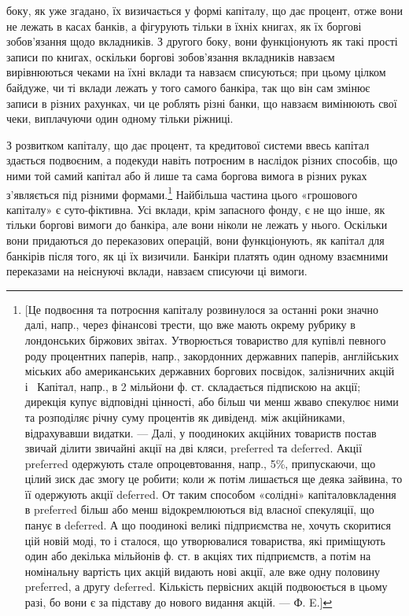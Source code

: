 \parcont{}  %
боку, як уже згадано, їх визичається у формі капіталу, що дає процент, отже
вони не лежать в касах банків, а фігурують тільки в їхніх книгах, як їх боргові
зобов’язання щодо вкладників. З другого боку, вони функціонують як такі прості
записи по книгах, оскільки боргові зобов’язання вкладників навзаєм вирівнюються
чеками на їхні вклади та навзаєм списуються; при цьому цілком байдуже,
чи ті вклади лежать у того самого банкіра, так що він сам змінює записи
в різних рахунках, чи це роблять різні банки, що навзаєм вимінюють свої
чеки, виплачуючи один одному тільки ріжниці.

З розвитком капіталу, що дає процент, та кредитової системи ввесь капітал
здається подвоєним, а подекуди навіть потроєним в наслідок різних способів,
що ними той самий капітал або й лише та сама боргова вимога в різних
руках з’являється під різними формами.\footnote{
[Це подвоєння та потроєння капіталу розвинулося за останні роки значно далі, напр., через
фінансові трести, що вже мають окрему рубрику в лондонських біржових звітах. Утворюється товариство
для купівлі певного роду процентних паперів, напр., закордонних державних паперів, англійських
міських або американських державних боргових посвідок, залізничних акцій і~ Капітал,
напр., в 2 мільйони ф. ст. складається підпискою на акції; дирекція купує відповідні цінності, або
більш чи менш жваво спекулює ними та розподіляє річну суму процентів як дивіденд. між акційниками,
відрахувавши видатки. — Далі, у поодиноких акційних товариств постав звичай ділити звичайні акції
на дві кляси, preferred та deferred. Акції preferred одержують стале опроцевтовання, напр., 5\%,
припускаючи, що цілий зиск дає змогу це робити; коли ж потім лишається ще деяка зайвина, то її
одержують акції deferred. От таким способом «солідні» капіталовкладення в preferred більш або менш
відокремлюються від власної спекуляції, що панує в deferred. А що поодинокі великі підприємства
не, хочуть скоритися цій новій моді, то і сталося, що утворювалися товариства, які приміщують один
або декілька мільйонів ф. ст. в акціях тих підприємств, а потім на номінальну вартість цих акцій
видають
нові акції, але вже одну половину preferred, а другу deferred. Кількість первісних акцій подвоюється
в цьому разі, бо вони є за підставу до нового видання акцій. — Ф. E.]
} Найбільша частина цього «грошового
капіталу» є суто-фіктивна. Усі вклади, крім запасного фонду, є не що інше,
як тільки боргові вимоги до банкіра, але вони ніколи не лежать у нього. Оскільки
вони придаються до переказових операцій, вони функціонують, як капітал для
банкірів після того, як ці їх визичили. Банкіри платять один одному взаємними
переказами на неіснуючі вклади, навзаєм списуючи ці вимоги.

